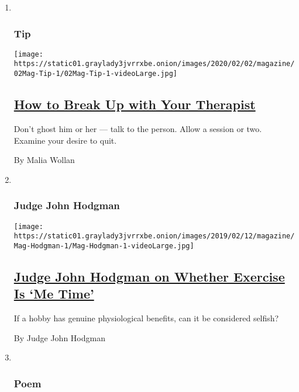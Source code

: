 \begin{enumerate}
\def\labelenumi{\arabic{enumi}.}
\item ~
  \hypertarget{tip}{%
  \subsubsection{Tip}\label{tip}}

  \texttt{[image: https://static01.graylady3jvrrxbe.onion/images/2020/02/02/magazine/02Mag-Tip-1/02Mag-Tip-1-videoLarge.jpg]}

  \hypertarget{how-to-break-up-with-your-therapist}{%
  \subsection{\texorpdfstring{\href{/2020/01/28/magazine/how-to-break-up-with-your-therapist.html}{How
  to Break Up with Your
  Therapist}}{How to Break Up with Your Therapist}}\label{how-to-break-up-with-your-therapist}}

  Don't ghost him or her --- talk to the person. Allow a session or two.
  Examine your desire to quit.

  By Malia Wollan
\item ~
  \hypertarget{judge-john-hodgman}{%
  \subsubsection{Judge John Hodgman}\label{judge-john-hodgman}}

  \texttt{[image: https://static01.graylady3jvrrxbe.onion/images/2019/02/12/magazine/Mag-Hodgman-1/Mag-Hodgman-1-videoLarge.jpg]}

  \hypertarget{judge-john-hodgman-on-whether-exercise-is-me-time}{%
  \subsection{\texorpdfstring{\href{/2020/01/30/magazine/judge-john-hodgman-on-whether-exercise-is-me-time.html}{Judge
  John Hodgman on Whether Exercise Is `Me
  Time'}}{Judge John Hodgman on Whether Exercise Is `Me Time'}}\label{judge-john-hodgman-on-whether-exercise-is-me-time}}

  If a hobby has genuine physiological benefits, can it be considered
  selfish?

  By Judge John Hodgman
\item ~
  \hypertarget{poem}{%
  \subsubsection{Poem}\label{poem}}


\end{enumerate}
